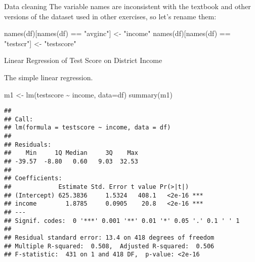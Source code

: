\documentclass[
  10pt,
  ignorenonframetext,
  t, svgnames, handout]{beamer}
\newenvironment{Shaded}{\begin{snugshade}}{\end{snugshade}}
\newcommand{\AttributeTok}[1]{\textcolor[rgb]{0.77,0.63,0.00}{#1}}
\newcommand{\FunctionTok}[1]{\textcolor[rgb]{0.00,0.00,0.00}{#1}}
\newcommand{\NormalTok}[1]{#1}
\newcommand{\OtherTok}[1]{\textcolor[rgb]{0.56,0.35,0.01}{#1}}
\newcommand{\SpecialCharTok}[1]{\textcolor[rgb]{0.00,0.00,0.00}{#1}}
\newcommand{\StringTok}[1]{\textcolor[rgb]{0.31,0.60,0.02}{#1}}
\begin{document}
\begin{frame}[fragile]{Data cleaning}
\protect\hypertarget{data-cleaning}{}
The variable names are inconsistent with the textbook and other versions
of the dataset used in other exercises, so let's rename them:

\scriptsize

\begin{Shaded}
\begin{Highlighting}[]
\FunctionTok{names}\NormalTok{(df)[}\FunctionTok{names}\NormalTok{(df) }\SpecialCharTok{==} \StringTok{"avginc"}\NormalTok{] }\OtherTok{\textless{}{-}} \StringTok{"income"}
\FunctionTok{names}\NormalTok{(df)[}\FunctionTok{names}\NormalTok{(df) }\SpecialCharTok{==} \StringTok{"testscr"}\NormalTok{] }\OtherTok{\textless{}{-}} \StringTok{"testscore"}
\end{Highlighting}
\end{Shaded}

\normalsize
\end{frame}

\begin{frame}[fragile]{Linear Regression of Test Score on District
Income}
\protect\hypertarget{linear-regression-of-test-score-on-district-income}{}
\begin{block}{The simple linear regression.}
\protect\hypertarget{the-simple-linear-regression.}{}
\scriptsize

\begin{Shaded}
\begin{Highlighting}[]
\NormalTok{m1 }\OtherTok{\textless{}{-}} \FunctionTok{lm}\NormalTok{(testscore }\SpecialCharTok{\textasciitilde{}}\NormalTok{ income, }\AttributeTok{data=}\NormalTok{df)}
\FunctionTok{summary}\NormalTok{(m1)}
\end{Highlighting}
\end{Shaded}

\begin{verbatim}
## 
## Call:
## lm(formula = testscore ~ income, data = df)
## 
## Residuals:
##    Min     1Q Median     3Q    Max 
## -39.57  -8.80   0.60   9.03  32.53 
## 
## Coefficients:
##             Estimate Std. Error t value Pr(>|t|)    
## (Intercept) 625.3836     1.5324   408.1   <2e-16 ***
## income        1.8785     0.0905    20.8   <2e-16 ***
## ---
## Signif. codes:  0 '***' 0.001 '**' 0.01 '*' 0.05 '.' 0.1 ' ' 1
## 
## Residual standard error: 13.4 on 418 degrees of freedom
## Multiple R-squared:  0.508,  Adjusted R-squared:  0.506 
## F-statistic:  431 on 1 and 418 DF,  p-value: <2e-16
\end{verbatim}

\normalsize
\end{block}
\end{frame}
\end{document}
